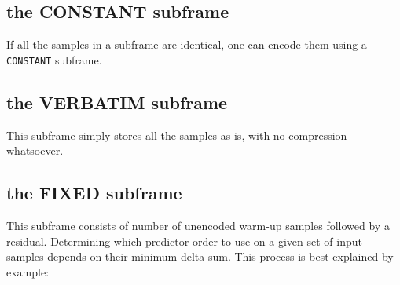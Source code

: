 \subsection{the CONSTANT subframe}

If all the samples in a subframe are identical, one can encode them
using a \texttt{CONSTANT} subframe.

\subsection{the VERBATIM subframe}

This subframe simply stores all the samples as-is,
with no compression whatsoever.

\subsection{the FIXED subframe}

This subframe consists of  number of unencoded
warm-up samples followed by a residual.
Determining which predictor order to use on a given set of input samples
depends on their minimum delta sum.
This process is best explained by example:

